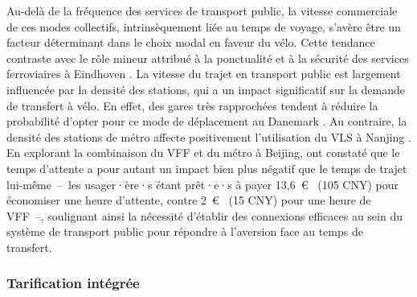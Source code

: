 \begin{refsegment}
Au-delà de la fréquence des services de transport public, la vitesse commerciale de ces modes collectifs, intrinsèquement liée au temps de voyage, s'avère être un facteur déterminant dans le choix modal en faveur du vélo. Cette tendance contraste avec le rôle mineur attribué à la ponctualité et à la sécurité des services ferroviaires à Eindhoven \textcolor{blue}{\autocite[727]{waerden_relation_2018}}. La vitesse du trajet en transport public est largement influencée par la densité des stations, qui a un impact significatif sur la demande de transfert à vélo. En effet, des gares très rapprochées tendent à réduire la probabilité d'opter pour ce mode de déplacement au Danemark \textcolor{blue}{\autocite[41]{nielsen_bikeability_2018}}. Au contraire, la densité des stations de métro affecte positivement l'utilisation du \acrshort{VLS} à Nanjing \textcolor{blue}{\autocite[17]{ji_exploring_2018}}. En explorant la combinaison du \acrshort{VFF} et du métro à Beijing, \textcolor{blue}{\textcite[10]{guo_exploring_2023}} ont constaté que le temps d'attente a pour autant un impact bien plus négatif que le temps de trajet lui-même~–~les usager·ère·s étant prêt·e·s à payer 13,6~\euro~ (105 CNY) pour économiser une heure d'attente, contre 2~\euro~ (15 CNY) pour une heure de \acrshort{VFF}~–, soulignant ainsi la nécessité d'établir des connexions efficaces au sein du système de transport public pour répondre à l'aversion face au temps de transfert.%

\subsubsection*{Tarification intégrée
    \label{chap2:tarification_integree}
    }
    

\end{refsegment}
